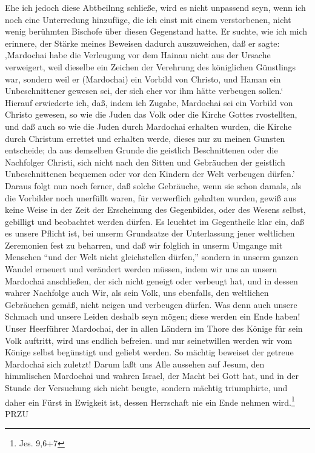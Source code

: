 Ehe ich jedoch diese Abtbeilnng schließe, wird es nicht unpassend seyn, wenn ich noch eine Unterredung hinzufüge, die ich einst mit einem verstorbenen, nicht wenig berühmten Bischofe über diesen Gegenstand hatte. Er suchte, wie ich mich erinnere, der Stärke meines Beweisen dadurch auszuweichen, daß er sagte: ‚Mardochai habe die Verleugung vor dem Hainau nicht aus der Ursache verweigert, weil dieselbe ein Zeichen der Verehrung des königlichen Günstlings war, sondern weil er (Mardochai) ein Vorbild von Christo, und Haman ein Unbeschnittener gewesen sei, der sich eher vor ihm hätte verbeugen sollen.‘ Hierauf erwiederte ich, daß, indem ich Zugabe, Mardochai sei ein Vorbild von Christo gewesen, so wie die Juden das Volk oder die Kirche Gottes rvostellten, und daß auch so wie die Juden durch Mardochai erhalten wurden, die Kirche durch Christum errettet und erhalten werde, dieses nur zu meinen Gunsten entscheide; da aus demselben Grunde die geistlich Beschnittenen oder die Nachfolger Christi, sich nicht nach den Sitten und Gebräuchen der geistlich Unbeschnittenen bequemen oder vor den Kindern der Welt verbeugen dürfen.' Daraus folgt nun noch ferner, daß solche Gebräuche, wenn sie schon damals, als die Vorbilder noch unerfüllt waren, für verwerflich gehalten wurden, gewiß aus keine Weise in der Zeit der Erscheinung des Gegenbildes, oder des Wesens selbst, gebilligt und beobachtet werden dürfen. Es leuchtet im Gegentheile klar ein, daß es unsere Pflicht ist, bei unserm Grundsatze der Unterlassung jener weltlichen Zeremonien fest zu beharren, und daß wir folglich in unserm Umgange mit Menschen "`und der Welt nicht gleichstellen dürfen,"' sondern in unserm ganzen Wandel erneuert und verändert werden müssen, indem wir uns an unsern Mardochai anschließen, der sich nicht geneigt oder verbeugt hat, und in dessen wahrer Nachfolge auch Wir, als sein Volk, uns ebenfalls, den weltlichen Gebräuchen gemäß, nicht neigen und verbeugen dürfen. Was denn auch unsere Schmach und unsere Leiden deshalb seyn mögen; diese werden ein Ende haben! Unser Heerführer Mardochai, der in allen Ländern im Thore des Könige für sein Volk auftritt, wird uns endlich befreien. und nur seinetwillen werden wir vom Könige selbst begünstigt und geliebt werden. So mächtig beweiset der getreue Mardochai sich zuletzt! Darum laßt uns Alle aussehen auf Jesum, den himmlischen Mardochai und wahren Israel, der Macht bei Gott hat, und in der Stunde der Versuchung sich nicht beugte, sondern mächtig triumphirte, und daher ein Fürst in Ewigkeit ist, dessen Herrschaft nie ein Ende nehmen wird.\footnote{Jes. 9,6+7} {{PRZU}}

